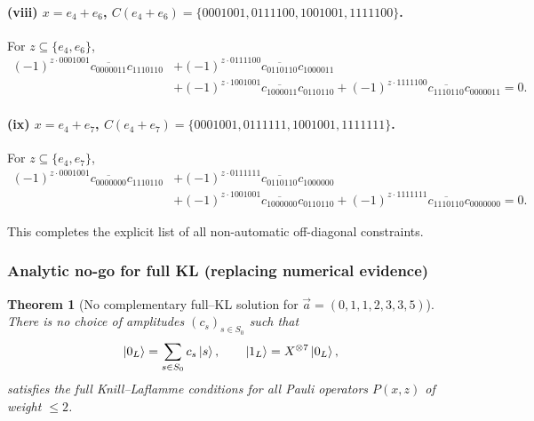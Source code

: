 \documentclass[11pt]{article}
\newtheorem{theorem}{Theorem}
\begin{document}
\paragraph{(viii) $x=e_4+e_6$, $C(e_4{+}e_6)=\{0001001,0111100,1001001,1111100\}$.}
For $z\subseteq\{e_4,e_6\}$,
\begin{align}
(-1)^{z\cdot 0001001}\overline{c_{0000011}}c_{1110110}
&+(-1)^{z\cdot 0111100}\overline{c_{0110110}}c_{1000011}\nonumber\\
&+(-1)^{z\cdot 1001001}\overline{c_{1000011}}c_{0110110}
+(-1)^{z\cdot 1111100}\overline{c_{1110110}}c_{0000011}=0.
\label{eq:offdiag-e4e6}
\end{align}

\paragraph{(ix) $x=e_4+e_7$, $C(e_4{+}e_7)=\{0001001,0111111,1001001,1111111\}$.}
For $z\subseteq\{e_4,e_7\}$,
\begin{align}
(-1)^{z\cdot 0001001}\overline{c_{0000000}}c_{1110110}
&+(-1)^{z\cdot 0111111}\overline{c_{0110110}}c_{1000000}\nonumber\\
&+(-1)^{z\cdot 1001001}\overline{c_{1000000}}c_{0110110}
+(-1)^{z\cdot 1111111}\overline{c_{1110110}}c_{0000000}=0.
\label{eq:offdiag-e4e7}
\end{align}

This completes the explicit list of all non-automatic off-diagonal constraints.

\subsubsection*{Analytic no-go for full KL (replacing numerical evidence)}
\begin{theorem}[No complementary full--KL solution for $\vec a=(0,1,1,2,3,3,5)$]
\label{thm:nogo-a0112335}
There is no choice of amplitudes $(c_s)_{s\in S_0}$ such that
\[
\ket{0_L}=\sum_{s\in S_0} c_s\ket{s},\qquad
\ket{1_L}=X^{\otimes 7}\ket{0_L},
\]
satisfies the full Knill--Laflamme conditions for all Pauli operators $P(x,z)$ of weight $\le 2$.
\end{theorem}
\end{document}
